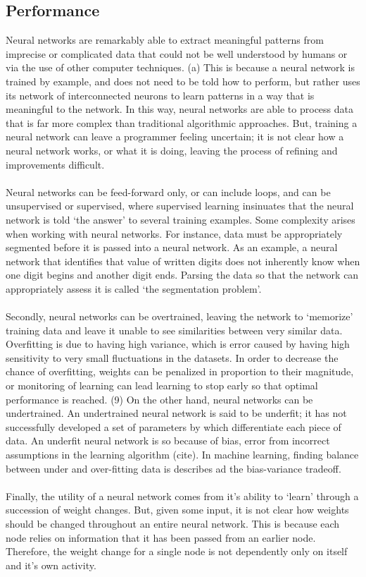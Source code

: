 \documentclass[12pt,twoside]{report}
\begin{document}
		\subsection{Performance}
Neural networks are remarkably able to extract meaningful patterns from imprecise or complicated data that could not be well understood by humans or via the use of other computer techniques. (a) This is because a neural network is trained by example, and does not need to be told how to perform, but rather uses its network of interconnected neurons to learn patterns in a way that is meaningful to the network. In this way, neural networks are able to process data that is far more complex than traditional algorithmic approaches. But, training a neural network can leave a programmer feeling uncertain; it is not clear how a neural network works, or what it is doing, leaving the process of refining and improvements difficult.
\\ \\
	Neural networks can be feed-forward only, or can include loops, and can be unsupervised or supervised, where supervised learning insinuates that the neural network is told ‘the answer’ to several training examples. Some complexity arises when working with neural networks. For instance, data must be appropriately segmented before it is passed into a neural network. As an example, a neural network that identifies that value of written digits does not inherently know when one digit begins and another digit ends. Parsing the data so that the network can appropriately assess it is called ‘the segmentation problem’. 
\\ \\
Secondly, neural networks can be overtrained, leaving the network to ‘memorize’ training data and leave it unable to see similarities between very similar data. Overfitting is due to having high variance, which is error caused by having high sensitivity to very small fluctuations in the datasets. In order to decrease the chance of overfitting, weights can be penalized in proportion to their magnitude, or monitoring of learning can lead learning to stop early so that optimal performance is reached. (9) On the other hand, neural networks can be undertrained. An undertrained neural network is said to be underfit; it has not successfully developed a set of parameters by which differentiate each piece of data. An underfit neural network is so because of bias, error from incorrect assumptions in the learning algorithm (cite). In machine learning, finding balance between under and over-fitting data is describes ad the bias-variance tradeoff.
\\ \\	
Finally, the utility of a neural network comes from it’s ability to ‘learn’ through a succession of weight changes. But, given some input, it is not clear how weights should be changed throughout an entire neural network. This is because each node relies on information that it has been passed from an earlier node. Therefore, the weight change for a single node is not dependently only on itself and it’s own activity. 
\end{document}
